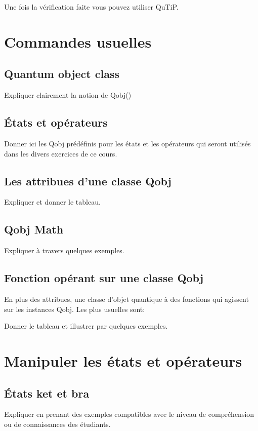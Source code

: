 Une fois la vérification faite vous pouvez utiliser QuTiP.

\section{Commandes usuelles}

\subsection{Quantum object class}
Expliquer clairement la notion de Qobj()

\subsection{États et opérateurs}
Donner ici les Qobj prédéfinis pour les états et les opérateurs qui seront 
utilisés dans les divers exercices de ce cours.

\subsection{Les attribues d'une classe Qobj}

Expliquer et donner le tableau.

\subsection{Qobj Math}

Expliquer à travers quelques exemples.

\subsection{Fonction opérant sur une classe Qobj}

En plus des attribues, une classe d'objet quantique à des fonctions qui 
agissent sur les instances Qobj. Les plus usuelles sont:

Donner le tableau et illustrer par quelques exemples.

\section{Manipuler les états et opérateurs}

\subsection{États ket et bra}

Expliquer en prenant des exemples compatibles avec le niveau de compréhension 
ou de connaissances des étudiants.


